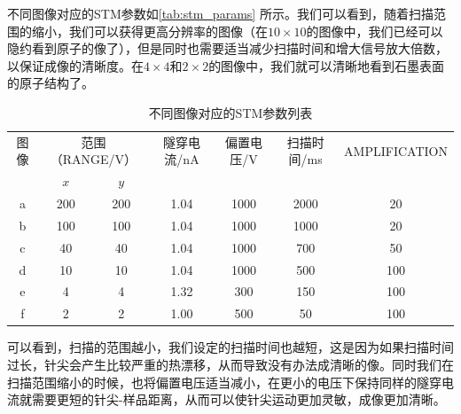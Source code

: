 \documentclass[font=default]{mpltx}
\begin{document}
不同图像对应的STM参数如\autoref{tab:stm_params} 所示。我们可以看到，随着扫描范围的缩小，我们可以获得更高分辨率的图像（在$10\times10$的图像中，我们已经可以隐约看到原子的像了），但是同时也需要适当减少扫描时间和增大信号放大倍数，以保证成像的清晰度。在$4\times4$和$2\times2$的图像中，我们就可以清晰地看到石墨表面的原子结构了。
\begin{table}[]
  \label{tab:stm_params}
  \caption{不同图像对应的STM参数列表}
  \vspace{0.2cm}
  \begin{tabular}{c|cc|c|c|c|c}
    \hline
  图像 & \multicolumn{2}{c|}{范围（RANGE/V）} & 隧穿电流/nA & 偏置电压/V & 扫描时间/ms & AMPLIFICATION \\
     & $x$     & $y$   &         &        &         &             \\\hline
  a  & 200     & 200 & 1.04    & 1000   & 2000    & 20            \\
  b  & 100     & 100 & 1.04    & 1000   & 1000    & 20            \\
  c  & 40      & 40  & 1.04    & 1000   & 700     & 50            \\
  d  & 10      & 10  & 1.04    & 1000   & 500     & 100           \\
  e  & 4       & 4   & 1.32    & 300    & 150     & 100           \\
  f  & 2       & 2   & 1.00    & 500    & 50      & 100           \\\hline
  \end{tabular}
\end{table}

可以看到，扫描的范围越小，我们设定的扫描时间也越短，这是因为如果扫描时间过长，针尖会产生比较严重的热漂移，从而导致没有办法成清晰的像。同时我们在扫描范围缩小的时候，也将偏置电压适当减小，在更小的电压下保持同样的隧穿电流就需要更短的针尖-样品距离，从而可以使针尖运动更加灵敏，成像更加清晰。
\end{document}
